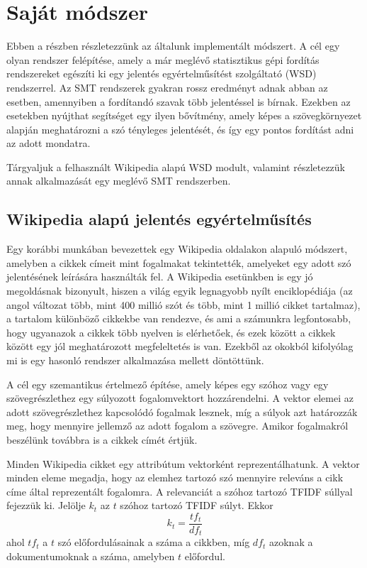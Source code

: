 \section{Saját módszer} \label{sec:new_method}

Ebben a részben részletezzünk az általunk implementált módszert. A cél egy olyan rendszer felépítése, amely a már meglévő statisztikus gépi fordítás rendszereket egészíti ki egy jelentés egyértelműsítést szolgáltató (WSD) rendszerrel. Az SMT rendszerek gyakran rossz eredményt adnak abban az esetben, amennyiben a fordítandó szavak több jelentéssel is bírnak. Ezekben az esetekben nyújthat segítséget egy ilyen bővítmény, amely képes a szövegkörnyezet alapján meghatározni a szó tényleges jelentését, és így egy pontos fordítást adni az adott mondatra. 

Tárgyaljuk a felhasznált Wikipedia alapú WSD modult, valamint részletezzük annak alkalmazását egy meglévő SMT rendszerben.

\subsection{Wikipedia alapú jelentés egyértelműsítés} \label{sec:WikiWSD}

Egy korábbi munkában \cite{Gabrilovich:2007:CSR} bevezettek egy Wikipedia oldalakon alapuló módszert, amelyben a cikkek címeit mint fogalmakat tekintették, amelyeket egy adott szó jelentésének leírására használták fel. A Wikipedia esetünkben is egy jó megoldásnak bizonyult, hiszen a világ egyik legnagyobb nyílt enciklopédiája (az angol változat több, mint 400 millió szót és több, mint 1 millió cikket tartalmaz), a tartalom különböző cikkekbe van rendezve, és ami a számunkra legfontosabb, hogy ugyanazok a cikkek több nyelven is elérhetőek, és ezek között a cikkek között egy jól meghatározott megfeleltetés is van. Ezekből az okokból kifolyólag mi is egy hasonló rendszer alkalmazása mellett döntöttünk.

A cél egy szemantikus értelmező építése, amely képes egy szóhoz vagy egy szövegrészlethez egy súlyozott fogalomvektort hozzárendelni. A vektor elemei az adott szövegrészlethez kapcsolódó fogalmak lesznek, míg a súlyok azt határozzák meg, hogy mennyire jellemző az adott fogalom a szövegre. Amikor fogalmakról beszélünk továbbra is a cikkek címét értjük. 

Minden Wikipedia cikket egy attribútum vektorként reprezentálhatunk. A vektor minden eleme megadja, hogy az elemhez tartozó szó mennyire releváns a cikk címe által reprezentált fogalomra. A relevanciát a szóhoz tartozó TFIDF súllyal fejezzük ki. Jelölje $k_t$ az $t$ szóhoz tartozó TFIDF súlyt. Ekkor 
\begin{equation}
	k_t = \frac{tf_t}{df_t}
\end{equation}
ahol $tf_t$ a $t$ szó előfordulásainak a száma a cikkben, míg $df_t$ azoknak a dokumentumoknak a száma, amelyben $t$ előfordul.

